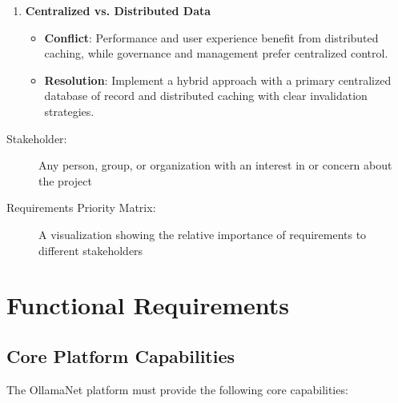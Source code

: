 \begin{enumerate}
   \item \textbf{Centralized vs. Distributed Data}
   \begin{itemize}
      \item \textbf{Conflict}: Performance and user experience benefit from distributed caching, while governance and management prefer centralized control.
      \item \textbf{Resolution}: Implement a hybrid approach with a primary centralized database of record and distributed caching with clear invalidation strategies.
   \end{itemize}
\end{enumerate}

\begin{terminology}
\begin{description}
    \item[Stakeholder:] Any person, group, or organization with an interest in or concern about the project
    \item[Requirements Priority Matrix:] A visualization showing the relative importance of requirements to different stakeholders
\end{description}
\end{terminology}

\section{Functional Requirements}

\subsection{Core Platform Capabilities}

The OllamaNet platform must provide the following core capabilities:

